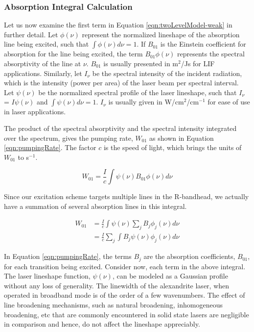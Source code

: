 \subsubsection{Absorption Integral Calculation}

Let us now examine the first term in Equation \ref{eqn:twoLevelModel-weak} in further detail.
Let \(\phi(\nu)\) represent the normalized lineshape of the absorption line being excited, such that \(\int \phi(\nu) d\nu = 1\).
If \(B_{01}\) is the Einstein coefficient for absorption for the line being excited, the term \(B_{01}\phi(\nu)\) represents the spectral absorptivity of the line at \(\nu\).
\(B_{01}\) is usually presented in m\(^2\)/Js for LIF applications.
Similarly, let \(I_\nu\) be the spectral intensity of the incident radiation, which is the intensity (power per area) of the laser beam per spectral interval.
Let \(\psi(\nu)\) be the normalized spectral profile of the laser lineshape, such that \(I_\nu\) = \(I \psi(\nu)\) and \(\int \psi(\nu) d\nu = 1\).
\(I_\nu\) is usually given in W/cm\(^2\)/cm\(^{-1}\) for ease of use in laser applications.

The product of the spectral absorptivity and the spectral intensity integrated over the spectrum, gives the pumping rate, \(W_{01}\) as shown in Equation \ref{eqn:pumpingRate}.
The factor \(c\) is the speed of light, which brings the units of \(W_{01}\) to s\(^{-1}\).

\begin{equation}
  W_{01} = \frac{I}{c} \int \psi(\nu) B_{01}\phi(\nu) d\nu
\end{equation}

Since our excitation scheme targets multiple lines in the R-bandhead, we actually have a summation of several absorption lines in this integral.

\begin{align}
  W_{01} & = \frac{I}{c} \int \psi(\nu) \sum_j B_j \phi_j (\nu) d\nu \nonumber \\
        & = \frac{I}{c} \sum_j \int B_j\psi(\nu)\phi_j(\nu) d\nu
  \label{eqn:pumpingRate}
\end{align}

In Equation \ref{eqn:pumpingRate}, the terms \(B_j\) are the absorption coefficients, \(B_{01}\), for each transition being excited.
Consider now, each term in the above integral.
The laser lineshape function, \(\psi(\nu)\), can be modeled as a Gaussian profile without any loss of generality.
The linewidth of the alexandrite laser, when operated in broadband mode is of the order of a few wavenumbers.
The effect of line broadening mechanisms, such as natural broadening, inhomogeneous broadening, etc that are commonly encountered in solid state lasers are negligible in comparison and hence, do not affect the lineshape appreciably.

